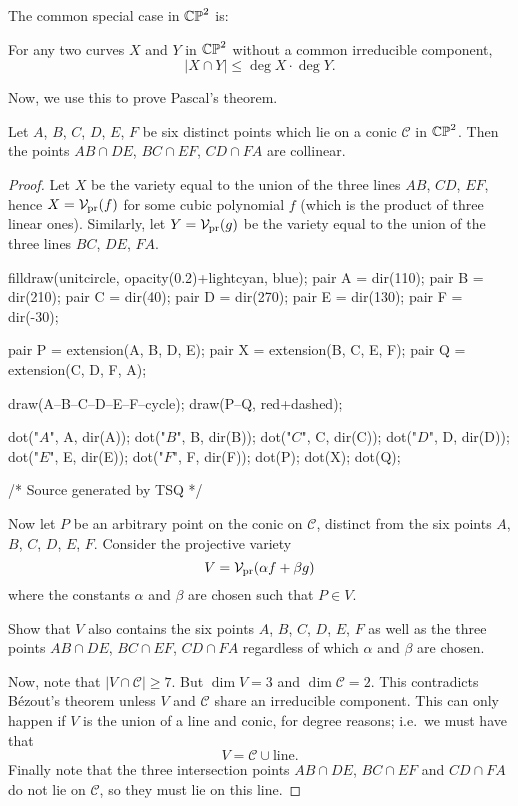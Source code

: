 The common special case in $\mathbb{CP}^2$ is:
\begin{corollary}
	For any two curves $X$ and $Y$ in $\mathbb{CP}^2$ without
	a common irreducible component,
	\[ \left\lvert X \cap Y \right\rvert 
		\le \deg X \cdot \deg Y. \]
\end{corollary}

Now, we use this to prove Pascal's theorem.
\begin{theorem}
	Let $A$, $B$, $C$, $D$, $E$, $F$ be six
	distinct points which lie on a conic $\mathscr C$ in $\mathbb{CP}^2$.
	Then the points $AB \cap DE$, $BC \cap EF$, $CD \cap FA$ are collinear.
\end{theorem}
\begin{proof}
	Let $X$ be the variety equal to the union of the
	three lines $AB$, $CD$, $EF$, hence $X = \mathcal V_{\text{pr}}(f)$
	for some cubic polynomial $f$ (which is the product of three linear ones).
	Similarly, let $Y = \mathcal V_{\text{pr}}(g)$ be the variety
	equal to the union of the three lines $BC$, $DE$, $FA$.

	\begin{center}
		\begin{asy}
			filldraw(unitcircle, opacity(0.2)+lightcyan, blue);
			pair A = dir(110);
			pair B = dir(210);
			pair C = dir(40);
			pair D = dir(270);
			pair E = dir(130);
			pair F = dir(-30);

			pair P = extension(A, B, D, E);
			pair X = extension(B, C, E, F);
			pair Q = extension(C, D, F, A);

			draw(A--B--C--D--E--F--cycle);
			draw(P--Q, red+dashed);

			dot("$A$", A, dir(A));
			dot("$B$", B, dir(B));
			dot("$C$", C, dir(C));
			dot("$D$", D, dir(D));
			dot("$E$", E, dir(E));
			dot("$F$", F, dir(F));
			dot(P);
			dot(X);
			dot(Q);

			/* Source generated by TSQ */
		\end{asy}
	\end{center}

	Now let $P$ be an arbitrary point on the conic on $\mathscr C$,
	distinct from the six points $A$, $B$, $C$, $D$, $E$, $F$.
	Consider the projective variety
	\[ V = \mathcal V_{\text{pr}}(\alpha f + \beta g) \]
	where the constants $\alpha$ and $\beta$ are chosen such that $P \in V$.
	\begin{ques}
		Show that $V$ also contains the six points $A$, $B$, $C$, $D$, $E$, $F$
		as well as the three points $AB \cap DE$, $BC \cap EF$, $CD \cap FA$
		regardless of which $\alpha$ and $\beta$ are chosen.
	\end{ques}

	Now, note that $|V \cap \mathscr C| \ge 7$.
	But $\dim V = 3$ and $\dim \mathscr C = 2$.
	This contradicts B\'ezout's theorem unless $V$ and $\mathscr C$
	share an irreducible component.
	This can only happen if $V$ is the union of a line and conic,
	for degree reasons; i.e.\ we must have that
	\[ V = \mathscr C \cup \text{line}. \]
	Finally note that the three intersection points $AB \cap DE$,
	$BC \cap EF$ and $CD \cap FA$ do not lie on $\mathscr C$,
	so they must lie on this line.
\end{proof}



